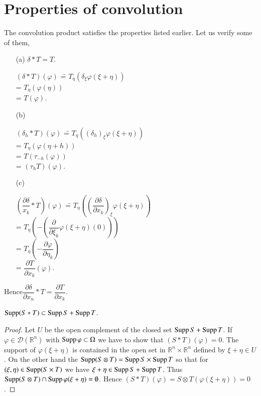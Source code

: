 \section*{Properties of convolution}\pageoriginale

The convolution product satisfies the properties listed earlier. Let
us verify some of them,
\begin{itemize}
\item[(a)] $\delta\ast T=T$.

\begin{tabbing}
$(\delta\ast T)(\varphi)$ \==
  $T_{\eta}(\delta_{\xi}\varphi(\xi+\eta))$\\[5pt]
\>= $T_{\eta}(\varphi(\eta))$\\[5pt]
\>= $T(\varphi)$.
\end{tabbing}

\item[(b)]
\begin{tabbing}
$(\delta_{h}\ast T)(\varphi)$ \==
  $T_{\eta}((\delta_{h})_{\xi}\varphi(\xi+\eta))$\\[5pt]
\>= $T_{\eta}(\varphi(\eta+h))$\\[5pt]
\>= $T(\tau_{-h}(\varphi))$\\[5pt]
\>= $(\tau_{h}T)(\varphi)$.
\end{tabbing}

\item[(c)] 
\begin{tabbing}
$\left(\dfrac{\partial\delta}{x_{k}}\ast T\right)(\varphi)$
  \== $T_{\eta}\left(\left(\dfrac{\partial \delta}{\partial
    x_{k}}\right)_{\xi}\varphi(\xi+\eta)\right)$\\[5pt]
\>= $T_{\eta}\left(-\left(\dfrac{\partial}{\partial
  \xi_{k}}\varphi(\xi+\eta)(0)\right)\right)$\\[5pt]
\>= $T_{\eta}\left(-\dfrac{\partial \varphi}{\partial
  \eta_{k}}\right)$\\[5pt]
\>= $\dfrac{\partial T}{\partial x_{k}}(\varphi)$.
\end{tabbing}
\end{itemize}
Hence\quad $\dfrac{\partial \delta}{\partial x_{n}}\ast
T=\dfrac{\partial T}{\partial x_{k}}$.

\begin{prop*}
$\operatorname{Supp} (S\ast T)\subset \operatorname{Supp} S+\operatorname{Supp} T$.
\end{prop*}

\begin{proof}
Let $U$ be the open complement of the closed set $\operatorname{Supp} S+\operatorname{Supp} T$. If
$\varphi\in \mathcal{D}(\mathbb{R}^{n})$ with $\operatorname{Supp} \varphi\subset
\Omega$ we have to show that $(S\ast T)(\varphi)=0$. The support of
$\varphi(\xi+\eta)$ is contained in the open set in
$\mathbb{R}^{n}\times \mathbb{R}^{n}$ defined by $\xi+\eta\in U$. On
the other hand the $\operatorname{Supp} (S\otimes T)=\operatorname{Supp} S\times \operatorname{Supp} T$ so that
for $(\xi,\eta)\in \operatorname{Supp} (S\times T)$ we have $\xi+\eta\in \operatorname{Supp}
S+\operatorname{Supp} T$. Thus $\operatorname{Supp} (S\otimes T)\cap \operatorname{Supp}
\varphi(\xi+\eta)=\emptyset$. Hence $(S\ast T)(\varphi)=S\otimes
T(\varphi(\xi+\eta))=0$. 
\end{proof}

